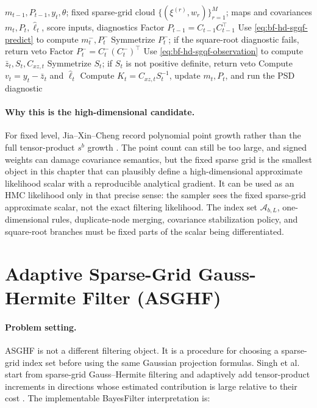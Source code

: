 \begin{algorithm}
\caption{RunFixedSparseGridFilterStep}
\label{alg:bf-hd-fixed-sgqf-step}
\begin{algorithmic}[1]
\Require \(m_{t-1},P_{t-1},y_t,\theta\); fixed sparse-grid cloud
\(\{(\xi^{(r)},w_r)\}_{r=1}^M\); maps and covariances
\Ensure \(m_t,P_t,\widehat\ell_t\), score inputs, diagnostics
\State Factor \(P_{t-1}=C_{t-1}C_{t-1}^\top\)
\State Use \eqref{eq:bf-hd-sgqf-predict} to compute \(m_t^-,P_t^-\)
\State Symmetrize \(P_t^-\); if the square-root diagnostic fails, return veto
\State Factor \(P_t^-=C_t^-(C_t^-)^\top\)
\State Use \eqref{eq:bf-hd-sgqf-observation} to compute
\(\bar z_t,S_t,C_{xz,t}\)
\State Symmetrize \(S_t\); if \(S_t\) is not positive definite, return veto
\State Compute \(v_t=y_t-\bar z_t\) and \(\widehat\ell_t\)
\State Compute \(K_t=C_{xz,t}S_t^{-1}\), update \(m_t,P_t\), and run the PSD
diagnostic
\end{algorithmic}
\end{algorithm}

\paragraph{Why this is the high-dimensional candidate.}
For fixed level, Jia--Xin--Cheng record polynomial point growth rather than the
full tensor-product \(s^b\) growth \citep[Proposition 3.1 and Appendix
point-count examples]{jia2012sparsegrid}.  The point count can still be too
large, and signed weights can damage covariance semantics, but the fixed sparse
grid is the smallest object in this chapter that can plausibly define a
high-dimensional approximate likelihood scalar with a reproducible analytical
gradient.  It can be used as an HMC likelihood only in that precise sense: the
sampler sees the fixed sparse-grid approximate scalar, not the exact
filtering likelihood.  The index set \(\mathcal A_{b,L}\), one-dimensional
rules, duplicate-node merging, covariance stabilization policy, and
square-root branches must be fixed parts of the scalar being differentiated.

\section{Adaptive Sparse-Grid Gauss-Hermite Filter (ASGHF)}
\label{sec:bf-hd-asghf}

\paragraph{Problem setting.}
ASGHF is not a different filtering object.  It is a procedure for choosing a
sparse-grid index set before using the same Gaussian projection formulas.
Singh et al. start from sparse-grid Gauss--Hermite filtering and adaptively add
tensor-product increments in directions whose estimated contribution is large
relative to their cost \citep[Section 3]{singh2018adaptive}.  The implementable
BayesFilter interpretation is:

